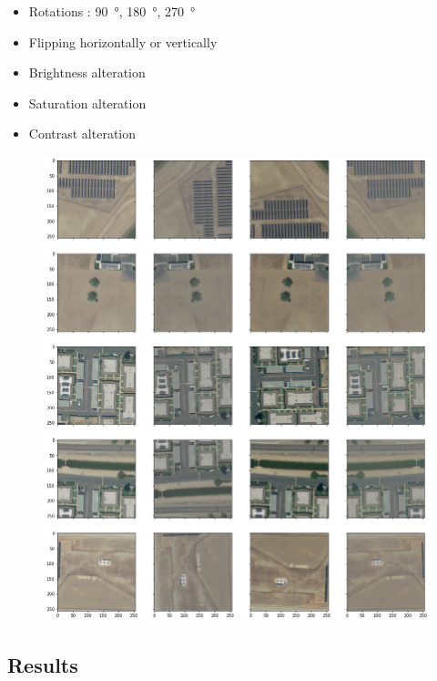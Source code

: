 \documentclass[a4paper, 12pt]{article}
\begin{document}
    \begin{itemize}[noitemsep]
        \item Rotations : \SI{90}{\degree}, \SI{180}{\degree}, \SI{270}{\degree} 
        \item Flipping horizontally or vertically
        \item Brightness alteration
        \item Saturation alteration
        \item Contrast alteration
    \end{itemize}
    
    \begin{figure}[H]
        \centering
        \includegraphics[width=\textwidth]{resources/png/augmentation.png}
    \end{figure}
    
    \subsection{Results}
    
\end{document}
